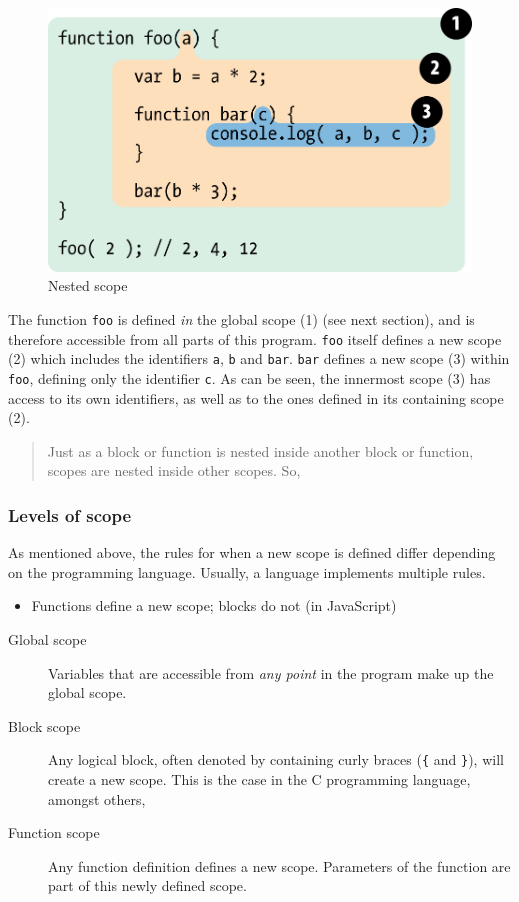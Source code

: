 \begin{figure}[htbp]
\centering
\includegraphics{fig2.png}
\caption{Nested scope \cite{getify}}
\end{figure}

The function \texttt{foo} is defined \emph{in} the global scope (1) (see
next section), and is therefore accessible from all parts of this
program. \texttt{foo} itself defines a new scope (2) which includes the
identifiers \texttt{a}, \texttt{b} and \texttt{bar}. \texttt{bar}
defines a new scope (3) within \texttt{foo}, defining only the
identifier \texttt{c}. As can be seen, the innermost scope (3) has
access to its own identifiers, as well as to the ones defined in its
containing scope (2).

\begin{quote}
Just as a block or function is nested inside another block or function,
scopes are nested inside other scopes. So,
\end{quote}

\subsubsection{Levels of scope}\label{levels-of-scope}

As mentioned above, the rules for when a new scope is defined differ
depending on the programming language. Usually, a language implements
multiple rules.

\begin{itemize}
\itemsep1pt\parskip0pt
\item
  Functions define a new scope; blocks do not (in JavaScript)
\end{itemize}

\begin{description}
\item[Global scope]
Variables that are accessible from \emph{any point} in the program make
up the global scope.
\item[Block scope]
Any logical block, often denoted by containing curly braces (\texttt{\{}
and \texttt{\}}), will create a new scope. This is the case in the C
programming language, amongst others,
\item[Function scope]
Any function definition defines a new scope. Parameters of the function
are part of this newly defined scope.
\end{description}

